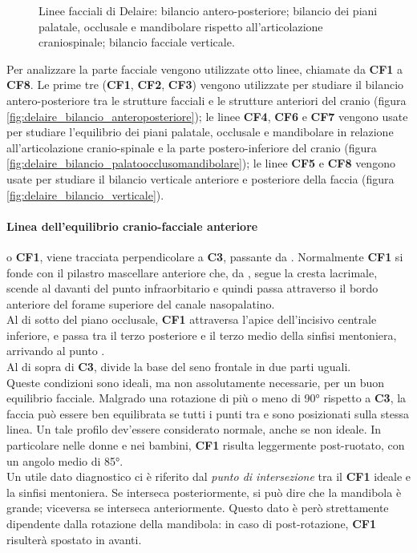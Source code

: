\begin{figure}[h!]
\caption{Linee facciali di Delaire:  bilancio antero-posteriore;  bilancio dei piani palatale, occlusale e mandibolare rispetto all'articolazione craniospinale;  bilancio facciale verticale.}
\label{fig:delaire_facciali}
\end{figure}

Per analizzare la parte facciale vengono utilizzate otto linee, chiamate da \textbf{CF1} a \textbf{CF8}. Le prime tre (\textbf{CF1}, \textbf{CF2}, \textbf{CF3}) vengono utilizzate per studiare il bilancio antero-posteriore tra le strutture facciali e le strutture anteriori del cranio (figura \vref{fig:delaire_bilancio_anteroposteriore}); le linee \textbf{CF4}, \textbf{CF6} e \textbf{CF7} vengono usate per studiare l'equilibrio dei piani palatale, occlusale e mandibolare in relazione all'articolazione cranio-spinale e la parte postero-inferiore del cranio (figura \vref{fig:delaire_bilancio_palatoocclusomandibolare}); le linee \textbf{CF5} e \textbf{CF8} vengono usate per studiare il bilancio verticale anteriore e posteriore della faccia (figura \vref{fig:delaire_bilancio_verticale}).\\

\paragraph{Linea dell'equilibrio cranio-facciale anteriore} o \textbf{CF1}, viene tracciata perpendicolare a \textbf{C3}, passante da . Normalmente \textbf{CF1} si fonde con il pilastro mascellare anteriore che, da , segue la cresta lacrimale, scende al davanti del punto infraorbitario e quindi passa attraverso il bordo anteriore del forame superiore del canale nasopalatino.\\
Al di sotto del piano occlusale, \textbf{CF1} attraversa l'apice dell'incisivo centrale inferiore, e passa tra il terzo posteriore e il terzo medio della sinfisi mentoniera, arrivando al punto .\\
Al di sopra di \textbf{C3}, divide la base del seno frontale in due parti uguali.\\
Queste condizioni sono ideali, ma non assolutamente necessarie, per un buon equilibrio facciale. Malgrado una rotazione di più o meno di 90° rispetto a \textbf{C3}, la faccia può essere ben equilibrata se tutti i punti tra  e  sono posizionati sulla stessa linea. Un tale profilo dev'essere considerato normale, anche se non ideale. In particolare nelle donne e nei bambini, \textbf{CF1} risulta leggermente post-ruotato, con un angolo medio di 85°.\\
Un utile dato diagnostico ci è riferito dal \emph{punto di intersezione} tra il \textbf{CF1} ideale e la sinfisi mentoniera. Se interseca posteriormente, si può dire che la mandibola è grande; viceversa se interseca anteriormente. Questo dato è però strettamente dipendente dalla rotazione della mandibola: in caso di post-rotazione, \textbf{CF1} risulterà spostato in avanti.\\

